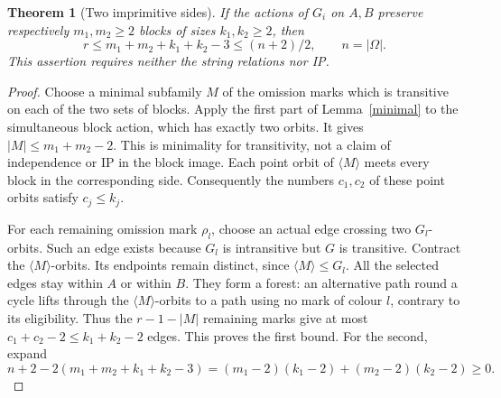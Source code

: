 \documentclass[11pt,a4paper]{article}
\newtheorem{theorem}[lemma]{Theorem}
\newcommand{\gen}[1]{\langle#1\rangle}
\begin{document}
\begin{theorem}[Two imprimitive sides]\label{both}
If the actions of $G_i$ on $A,B$ preserve respectively
$m_1,m_2\ge2$ blocks of sizes $k_1,k_2\ge2$, then
\[
                    r\le m_1+m_2+k_1+k_2-3\le(n+2)/2,
       \qquad n=|\Omega|.
\]
This assertion requires neither the string relations nor IP.
\end{theorem}
\begin{proof}
Choose a minimal subfamily $M$ of the omission marks which
is transitive on each of the two sets of blocks. Apply the
first part of Lemma~\ref{minimal} to the simultaneous block
action, which has exactly two orbits. It gives
$|M|\le m_1+m_2-2$. This is minimality for transitivity,
not a claim of independence or IP in the block image.
Each point orbit of $\gen M$ meets every block in the
corresponding side. Consequently the numbers $c_1,c_2$ of
these point orbits satisfy $c_j\le k_j$.

For each remaining omission mark $\rho_l$, choose an actual
edge crossing two $G_l$-orbits. Such an edge exists because
$G_l$ is intransitive but $G$ is transitive. Contract the
$\gen M$-orbits. Its endpoints remain distinct, since
$\gen M\le G_l$. All the selected edges stay within $A$
or within $B$. They form a forest: an alternative path
round a cycle lifts through the $\gen M$-orbits to a path
using no mark of colour $l$, contrary to its eligibility.
Thus the $r-1-|M|$ remaining marks give at most
$c_1+c_2-2\le k_1+k_2-2$ edges. This proves the first bound.
For the second, expand
\[
 n+2-2(m_1+m_2+k_1+k_2-3)
              =(m_1-2)(k_1-2)+(m_2-2)(k_2-2)\ge0.
\]
\end{proof}
\end{document}
